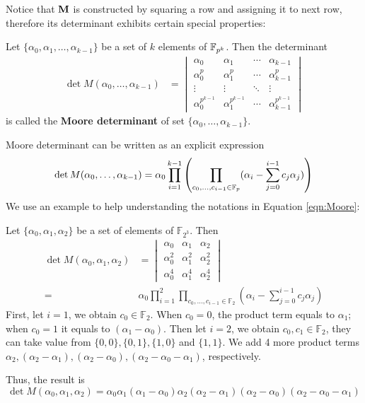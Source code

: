 Notice that ${\bf M}$ is constructed by squaring a row and assigning it to next row,
therefore its determinant exhibits certain special properties:
\begin{Definition}
Let $\{\alpha_0,\alpha_1,\dots,\alpha_{k-1}\}$ be a set of $k$ elements of ${\mathbb{F}}_{p^k}$. Then the determinant
\begin{align}
\det{M(\alpha_0,\dots,\alpha_{k-1})} &= 
\begin{vmatrix}
\alpha_0 & \alpha_1 & \cdots & \alpha_{k-1} \\
\alpha_0^p & \alpha_1^p & \cdots & \alpha_{k-1}^p \\
\vdots & \vdots & \ddots & \vdots \\
\alpha_0^{p^{k-1}} & \alpha_1^{p^{k-1}} & \cdots & \alpha_{k-1}^{p^{k-1}}
\end{vmatrix}
\end{align}
is called the {\bf Moore determinant} of set $\{\alpha_0,\dots,\alpha_{k-1}\}$.
\end{Definition}
Moore determinant can be written as an explicit expression
\begin{equation}
\label{eqn:Moore}
\det{M(\alpha_0,\dots,\alpha_{k-1})} = \alpha_0 \prod_{i=1}^{k-1}\left( \prod_{c_0,\dots,c_{i-1}\in {\mathbb{F}}_{p}} (\alpha_{i} - \sum_{j=0}^{i-1}c_j\alpha_j)\right)
\end{equation}
We use an example to help understanding the notations in Equation \ref{eqn:Moore}:
\begin{Example}
Let $\{\alpha_0,\alpha_1,\alpha_2\}$ be a set of elements of $\mathbb F_{2^3}$. Then
\begin{align}
\det{M(\alpha_0,\alpha_1,\alpha_2)} &= 
\begin{vmatrix}
\alpha_0 & \alpha_1 & \alpha_2 \\
\alpha_0^2 & \alpha_1^2 & \alpha_2^2 \\
\alpha_0^4 & \alpha_1^4 & \alpha_2^4
\end{vmatrix} \\ \nonumber
=& \alpha_0 \prod_{i=1}^{2} \prod_{c_0,\dots,c_{i-1}\in \mathbb F_2} (\alpha_{i} - \displaystyle\sum_{j=0}^{i-1}c_j\alpha_j)
\end{align}
First, let $i=1$,  we obtain $c_0\in \mathbb F_2$. When $c_0=0$, the product term equals to $\alpha_1$; when $c_0=1$ it equals to $(\alpha_1-\alpha_0)$.
Then let $i=2$, we obtain ${c_0,c_1}\in \mathbb F_2$, they can take value from $\{0,0\},\{0,1\},\{1,0\}$ and $\{1,1\}$.
We add 4 more product terms $\alpha_2,(\alpha_2-\alpha_1),(\alpha_2-\alpha_0),(\alpha_2-\alpha_0-\alpha_1)$, respectively.

Thus, the result is
\begin{equation}
\det{M(\alpha_0,\alpha_1,\alpha_2)} = \alpha_0\alpha_1(\alpha_1-\alpha_0)\alpha_2(\alpha_2-\alpha_1)(\alpha_2-\alpha_0)(\alpha_2-\alpha_0-\alpha_1)
\end{equation}
\end{Example}
